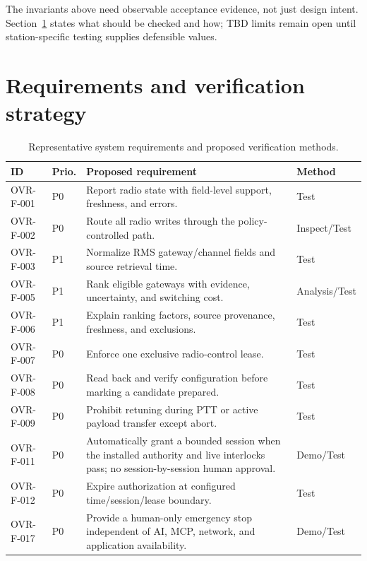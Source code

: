 \documentclass[11pt,a4paper]{article}
\begin{document}
The invariants above need observable acceptance evidence, not just design
intent. Section~\ref{sec:requirements-verification} states what should be
checked and how; TBD limits remain open until station-specific testing
supplies defensible values.


\section{Requirements and verification strategy}\label{sec:requirements-verification}

\clearpage
\begin{landscape}
\thispagestyle{plain}
\small
\begin{longtable}{@{}p{0.95in}p{0.55in}p{4.65in}p{1.0in}@{}}
\caption{Representative system requirements and proposed verification methods.}\label{tab:requirements}\\
\toprule
\textbf{ID} & \textbf{Prio.} & \textbf{Proposed requirement} & \textbf{Method}\\
\midrule
\endhead
OVR-F-001 & P0 & Report radio state with field-level support, freshness, and errors. & Test \\
OVR-F-002 & P0 & Route all radio writes through the policy-controlled path. & Inspect/Test \\
OVR-F-003 & P1 & Normalize RMS gateway/channel fields and source retrieval time. & Test \\
OVR-F-005 & P1 & Rank eligible gateways with evidence, uncertainty, and switching cost. & Analysis/Test \\
OVR-F-006 & P1 & Explain ranking factors, source provenance, freshness, and exclusions. & Test \\
OVR-F-007 & P0 & Enforce one exclusive radio-control lease. & Test \\
OVR-F-008 & P0 & Read back and verify configuration before marking a candidate prepared. & Test \\
OVR-F-009 & P0 & Prohibit retuning during PTT or active payload transfer except abort. & Test \\
OVR-F-011 & P0 & Automatically grant a bounded session when the installed authority and live interlocks pass; no session-by-session human approval. & Demo/Test \\
OVR-F-012 & P0 & Expire authorization at configured time/session/lease boundary. & Test \\
OVR-F-017 & P0 & Provide a human-only emergency stop independent of AI, MCP, network, and application availability. & Demo/Test \\

\end{longtable}
\end{landscape}
\end{document}
